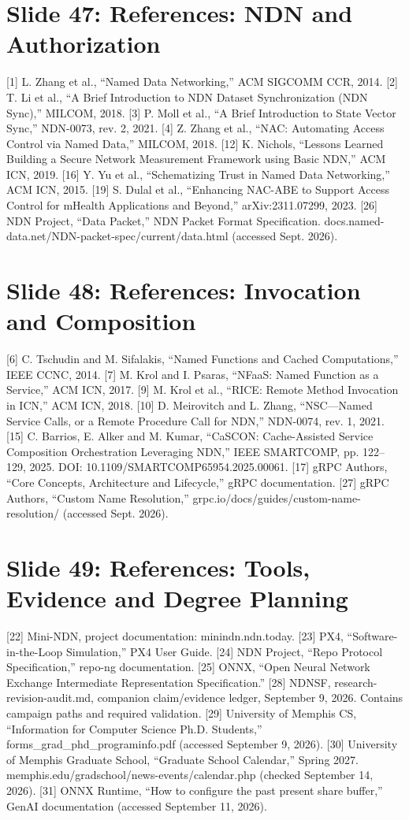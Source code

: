 \documentclass[11pt]{article}
\newcommand{\slideentry}[3]{\section*{Slide #1: #2}#3\par}
\begin{document}
\slideentry{47}{References: NDN and Authorization}{
[1] L. Zhang et al., “Named Data Networking,” ACM SIGCOMM CCR, 2014. [2] T. Li et al., “A Brief Introduction to NDN Dataset Synchronization (NDN Sync),” MILCOM, 2018. [3] P. Moll et al., “A Brief Introduction to State Vector Sync,” NDN-0073, rev. 2, 2021. [4] Z. Zhang et al., “NAC: Automating Access Control via Named Data,” MILCOM, 2018. [12] K. Nichols, “Lessons Learned Building a Secure Network Measurement Framework using Basic NDN,” ACM ICN, 2019. [16] Y. Yu et al., “Schematizing Trust in Named Data Networking,” ACM ICN, 2015. [19] S. Dulal et al., “Enhancing NAC-ABE to Support Access Control for mHealth Applications and Beyond,” arXiv:2311.07299, 2023. [26] NDN Project, “Data Packet,” NDN Packet Format Specification. docs.named-data.net/NDN-packet-spec/current/data.html (accessed Sept. 2026).
}
\slideentry{48}{References: Invocation and Composition}{
[6] C. Tschudin and M. Sifalakis, “Named Functions and Cached Computations,” IEEE CCNC, 2014. [7] M. Krol and I. Psaras, “NFaaS: Named Function as a Service,” ACM ICN, 2017. [9] M. Krol et al., “RICE: Remote Method Invocation in ICN,” ACM ICN, 2018. [10] D. Meirovitch and L. Zhang, “NSC---Named Service Calls, or a Remote Procedure Call for NDN,” NDN-0074, rev. 1, 2021. [15] C. Barrios, E. Alker and M. Kumar, “CaSCON: Cache-Assisted Service Composition Orchestration Leveraging NDN,” IEEE SMARTCOMP, pp. 122--129, 2025. DOI: 10.1109/SMARTCOMP65954.2025.00061. [17] gRPC Authors, “Core Concepts, Architecture and Lifecycle,” gRPC documentation. [27] gRPC Authors, “Custom Name Resolution,” grpc.io/docs/guides/custom-name-resolution/ (accessed Sept. 2026).
}
\slideentry{49}{References: Tools, Evidence and Degree Planning}{
[22] Mini-NDN, project documentation: minindn.ndn.today. [23] PX4, “Software-in-the-Loop Simulation,” PX4 User Guide. [24] NDN Project, “Repo Protocol Specification,” repo-ng documentation. [25] ONNX, “Open Neural Network Exchange Intermediate Representation Specification.” [28] NDNSF, research-revision-audit.md, companion claim/evidence ledger, September 9, 2026. Contains campaign paths and required validation. [29] University of Memphis CS, “Information for Computer Science Ph.D. Students,” forms\_grad\_phd\_programinfo.pdf (accessed September 9, 2026). [30] University of Memphis Graduate School, “Graduate School Calendar,” Spring 2027. memphis.edu/gradschool/news-events/calendar.php (checked September 14, 2026). [31] ONNX Runtime, “How to configure the past present share buffer,” GenAI documentation (accessed September 11, 2026).
}
\end{document}

